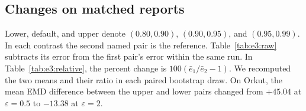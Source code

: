 \documentclass[10pt,letterpaper]{article}
\makeatletter
\newcommand{\resultCI}[3]{\ensuremath{#1\,[#2,\,#3]}}
\newcommand{\scaledCI}[4]{\ensuremath{(#1\,[#2,\,#3])\times 10^{#4}}}
\newcommand{\twoLines}[2]{\begin{tabular}[c]{@{}r@{}}\ensuremath{#1}\\[-1pt]\ensuremath{#2}\end{tabular}}
\newcommand{\compactCI}[3]{\twoLines{#1}{[#2,\,#3]}}
\newcommand{\compactScaledCI}[4]{\twoLines{#1\times10^{#4}}{[#2,\,#3]\times10^{#4}}}
\makeatother
\begin{document}
\subsection*{Changes on matched reports}
Lower, default, and upper denote $(0.80,0.90)$, $(0.90,0.95)$, and $(0.95,0.99)$.
In each contrast the second named pair is the reference. Table~\ref{tab:e3:raw}
subtracts its error from the first pair's error within the same run. In
Table~\ref{tab:e3:relative}, the percent change is $100(\bar e_1/\bar e_2-1)$.
We recomputed the two means and their ratio in each paired bootstrap draw.
On Orkut, the mean EMD difference between the upper and lower pairs changed
from $+45.04$ at $\varepsilon=0.5$ to $-13.38$ at $\varepsilon=2$.


\begingroup\fontsize{8.6}{10.2}\selectfont\setlength{\tabcolsep}{2.0pt}
\let\resultCI\compactCI\let\scaledCI\compactScaledCI
\end{document}
